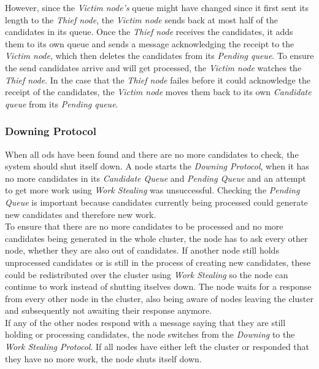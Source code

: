 However, since the \emph{Victim node's} queue might have changed since it first sent its length to the \emph{Thief node}, the \emph{Victim node} sends back at most half of the candidates in its queue.
Once the \emph{Thief node} receives the candidates, it adds them to its own queue and sends a message acknowledging the receipt to the \emph{Victim node}, which then deletes the candidates from its \emph{Pending queue}. 
To ensure the send candidates arrive and will get processed, the \emph{Victim node} watches the \emph{Thief node}.
In the case that the \emph{Thief node} failes before it could acknowledge the receipt of the candidates, the \emph{Victim node} moves them back to its own \emph{Candidate queue} from its \emph{Pending queue}.
 
\subsubsection{Downing Protocol} \label{protocol:downing}
When all \glspl{od} have been found and there are no more candidates to check, the system should shut itself down.
A node starts the \emph{Downing Protocol}, when it has no more candidates in its \emph{Candidate Queue} and \emph{Pending Queue} and an attempt to get more work using \emph{Work Stealing} was unsuccessful. 
Checking the \emph{Pending Queue} is important because candidates currently being processed could generate new candidates and therefore new work.\\
To ensure that there are no more candidates to be processed and no more candidates being generated in the whole cluster, the node has to ask every other node, whether they are also out of candidates.
If another node still holds unprocessed candidates or is still in the process of creating new candidates, these could be redistributed over the cluster using \emph{Work Stealing} so the node can continue to work instead of shutting itselves down.
The node waits for a response from every other node in the cluster, also being aware of nodes leaving the cluster and subsequently not awaiting their response anymore.\\
If any of the other nodes respond with a message saying that they are still holding or processing candidates, the node switches from the \emph{Downing} to the \emph{Work Stealing Protocol}.
If all nodes have either left the cluster or responded that they have no more work, the node shuts itself down.

